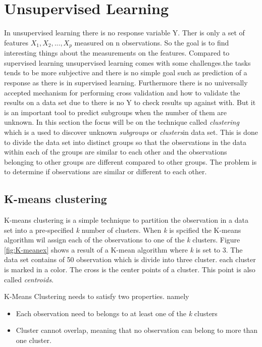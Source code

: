 \chapter{Unsupervised Learning}
\label{chp:unsuplea}
In unsupervised learning there is no response variable Y. Ther is only a set of features $X_1, X_2,..., X_p$ measured on n observations. So the goal is to find interesting things about the measurements on the features.
Compared to supervised learning unsupervised learning comes with some challenges.the tasks tends to be more subjective and there is no simple goal such as prediction of a response as there is in supervised learning. Furthermore there is no universally accepted mechanism for performing cross validation and how to validate the results on a data set due to there is no Y to check results up against with.
But it is an important tool to predict subgroups when the number of them are unknown.
In this section the focus will be on the  technique called \emph{clustering} which is a used to discover unknown \emph{subgroups} or \emph{clusters}in data set. This is done to divide the data set into distinct groups so that the observations in the data within each of the groups are similar to each other and the observations belonging to other groups are different compared to other groups. 
The problem is to determine if observations are similar or different to each other.
 
\section{K-means clustering}
\label{chp:clus}
K-means clustering is a simple technique to partition the observation in a data set into a pre-specified \emph{k} number of clusters. When \emph{k} is spcified the K-means algorithm wil assign each of the observations to one of the \emph{k} clusters.
Figure \ref{fig:K-meanex} shows a result of a K-mean algorithm where \emph{k} is set to 3. The data set contains of 50 observation which is divide into three cluster. each cluster is marked in a color. The cross is the center points of a cluster. This point is also called \emph{centroids}.


K-Means Clustering needs to satisfy two properties. namely
\begin{itemize}
	\item Each observation need to belongs to at least one of the \emph{k} clusters
	\item Cluster cannot overlap, meaning that no observation can belong to more than one cluster.
\end{itemize} 

